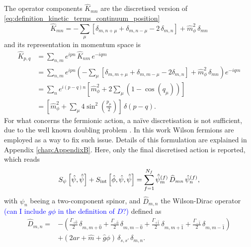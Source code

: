 The operator components $\widehat{K}_{mn}$ are the discretised version of \eqref{eq:definition_kinetic_terms_continuum_position}
\begin{equation}
    \widehat{K}_{mn} = - \sum_\mu \left[\delta_{m,n+\mu} + \delta_{m,n-\mu} - 2 \, \delta_{m,n}\right] + \hat{m}_\phi^2 \, \delta_{mn} 
    \label{eq:discretised_kinetic_op_bosons}
\end{equation}
and its representation in momentum space is
\begin{equation*}
	\begin{aligned}
		\widehat{K}_{p, q} & =\sum_{n, m} e^{i p n} \, \widehat{K}_{n m} \, e^{-i q m} \\
		& =\sum_{n, m} e^{i p n}\left(-\sum_\mu\left[\delta_{m,m+\mu}+\delta_{m,m-\mu}-2 \delta_{m, n}\right] + \hat{m}_\phi^2 \, \delta_{mn}\right) e^{-i q m} \\
		& =\sum_{n} e^{i(p-q) n}\left[\hat{m}_\phi^2+2\sum_\mu \left(1-\cos \left(q_\mu\right)\right)\right] \\
		& = \left[\hat{m}_\phi^2 + \sum_\mu 4 \sin ^2\left(\frac{p_\mu}{2}\right) \right] \, \delta(p-q) .
	\end{aligned}
\end{equation*}
For what concerns the fermionic action, a na\"ive discretisation is not sufficient, due to the well known doubling problem \cite{rothe_LGT,Montvay1994QuantumLattice}. In this work Wilson fermions \cite{wilson_lqcd} are employed as a way to fix such issue. Details of this formulation are explained in Appendix \ref{chap:AppendixB}. Here, only the final discretised action is reported, which reads
\begin{equation}
		S_\psi\left[\hat{\psi}, \hat{\bar{\psi}} \right] + S_\text{int}\left[\hat{\phi}, \hat{\psi}, \hat{\bar{\psi}} \right] = \sum_{f=1}^{N_f}\hat{\bar{\psi}}_m^{(f)} \, \widehat{D}_{mn} \, \hat{\psi}_n^{(f)},
\end{equation}
with $\psi_n$ beeing a two-component spinor, and $\widehat{D}_{m,n}$ the Wilson-Dirac operator \textcolor{blue}{(can I include $g\phi $ in the definition of $D$?)} defined as 
\begin{equation}
    \begin{aligned}
    \widehat{D}_{m, n} = &- \left(\frac{\Gamma_{+\hat 0}}{2} \, \delta_{m, m+\hat 0} +\frac{\Gamma_{-\hat 0}}{2} \, \delta_{m, m-\hat 0} + \frac{\Gamma_{+\hat 1}}{2} \, \delta_{m, m+\hat 1} + \frac{\Gamma_{- \hat 1}}{2} \, \delta_{m, m-\hat 1}\right)  \\
     &+ \left(2ar + \hat m + \hat g \phi\right) \, \delta_{s,s'} \, \delta_{m,n}. \\
    \end{aligned}
    \label{eq:wilson-dirac_operator}
\end{equation}
